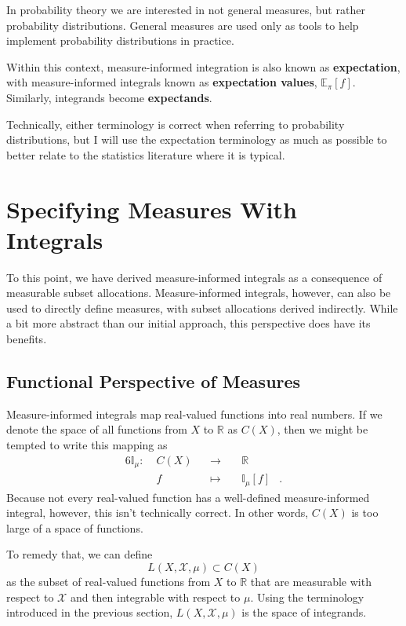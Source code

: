\documentclass[
  letterpaper,
  DIV=11,
  numbers=noendperiod]{scrartcl}
\begin{document}
In probability theory we are interested in not general measures, but
rather probability distributions. General measures are used only as
tools to help implement probability distributions in practice.

Within this context, measure-informed integration is also known as
\textbf{expectation}, with measure-informed integrals known as
\textbf{expectation values}, \(\mathbb{E}_{\pi}[f]\). Similarly,
integrands become \textbf{expectands}.

Technically, either terminology is correct when referring to probability
distributions, but I will use the expectation terminology as much as
possible to better relate to the statistics literature where it is
typical.

\section{Specifying Measures With
Integrals}\label{specifying-measures-with-integrals}

To this point, we have derived measure-informed integrals as a
consequence of measurable subset allocations. Measure-informed
integrals, however, can also be used to directly define measures, with
subset allocations derived indirectly. While a bit more abstract than
our initial approach, this perspective does have its benefits.

\subsection{Functional Perspective of
Measures}\label{functional-perspective-of-measures}

Measure-informed integrals map real-valued functions into real numbers.
If we denote the space of all functions from \(X\) to \(\mathbb{R}\) as
\(C(X)\), then we might be tempted to write this mapping as
\begin{alignat*}{6}
\mathbb{I}_{\mu} :\; & C(X) & &\rightarrow& \; & \mathbb{R} &
\\
& f & &\mapsto& & \mathbb{I}_{\mu}[f] &.
\end{alignat*} Because not every real-valued function has a well-defined
measure-informed integral, however, this isn't technically correct. In
other words, \(C(X)\) is too large of a space of functions.

To remedy that, we can define \[
L(X, \mathcal{X}, \mu) \subset C(X)
\] as the subset of real-valued functions from \(X\) to \(\mathbb{R}\)
that are measurable with respect to \(\mathcal{X}\) and then integrable
with respect to \(\mu\). Using the terminology introduced in the
previous section, \(L(X, \mathcal{X}, \mu)\) is the space of integrands.
\end{document}
